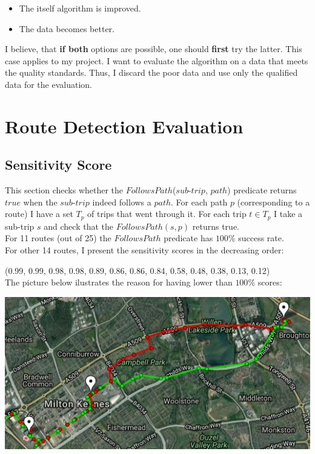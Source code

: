 \documentclass[12pt,a4paper,oneside,openright]{report}
\begin{document}
\begin{itemize} 
\item The itself algorithm is improved.
\item The data becomes better.
\end{itemize}

I believe, that \textbf{if both} options are possible, one should \textbf{first} try the latter.
This case applies to my project. I want to evaluate the algorithm on a data that meets
the quality standards. Thus, I discard the poor data and use only the qualified data for the
evaluation. \\


\section{Route Detection Evaluation}

\subsection{Sensitivity Score}

This section checks whether the $FollowsPath$($sub$-$trip$, $path$) predicate returns $true$
when the $sub$-$trip$ indeed follows a $path$. For each path $p$ (corresponding to a route) I
have a set $T_p$ of trips that went through it. For each trip $t \in T_p$ I take a
sub-trip $s$ and check that the $FollowsPath(s, p)$ returns true. \\

For 11 routes (out of 25) the $FollowsPath$ predicate has $100\%$ success rate. \\

For other 14 routes, I present the sensitivity scores in the decreasing order:

(0.99, 0.99, 0.98, 0.98, 0.89, 0.86, 0.86, 0.84, 0.58, 0.48, 0.38, 0.13, 0.12) \\

The picture below ilustrates the reason for having lower than $100\%$ scores:

\includegraphics[width=\textwidth]{figs/same_route_wrong_path.png}
\end{document}
